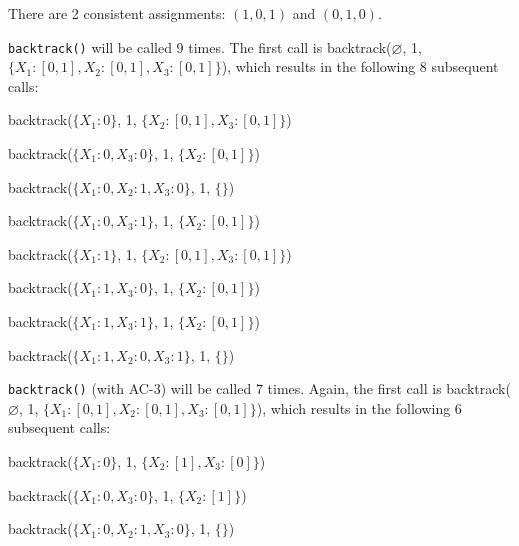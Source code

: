 \documentclass[11pt]{article}
\begin{document}
\begin{itemize}
	\item[i.] There are 2 consistent assignments: $(1, 0, 1)$ and $(0, 1, 0)$. 
	
	\item[ii.] \texttt{backtrack()} will be called 9 times. The first call is backtrack($\varnothing$, 1, $\{X_1: [0, 1], X_2: [0, 1], X_3: [0, 1]\}$), which results in the following 8 subsequent calls:
		
			\item backtrack($\{X_1:0, X_3: 1\}$, 1, $\{ X_2: [0, 1]  \}$)
		\end{compactitem} %
			
		\item backtrack($\{X_1:1\}$, 1, $\{ X_2: [0, 1], X_3: [0, 1]  \}$)
		\begin{compactitem}
			\item backtrack($\{X_1:1, X_3: 0\}$, 1, $\{ X_2: [0, 1]  \}$)

			\item backtrack($\{X_1:1, X_3: 1\}$, 1, $\{ X_2: [0, 1]  \}$)
			\begin{compactitem}
				\item backtrack($\{X_1:1, X_2: 0, X_3: 1\}$, 1, $\{ \}$)
			\end{compactitem}
		\end{compactitem} %
	\end{compactitem} 

	\item[iii.] \texttt{backtrack()} (with AC-3) will be called 7 times. Again, the first call is backtrack($\varnothing$, 1, $\{X_1: [0, 1], X_2: [0, 1], X_3: [0, 1]\}$), which results in the following 6 subsequent calls:

	\begin{compactitem}
	\item backtrack($\{X_1:0\}$, 1, $\{ X_2: [1], X_3: [0]  \}$)
	\begin{compactitem}
		\item backtrack($\{X_1:0, X_3: 0\}$, 1, $\{ X_2: [1]  \}$)
		\begin{compactitem}
			\item backtrack($\{X_1:0, X_2: 1, X_3: 0\}$, 1, $\{ \}$)
		\end{compactitem}
	\end{compactitem} %
	

\end{compactitem}
\end{itemize}
\end{document}
